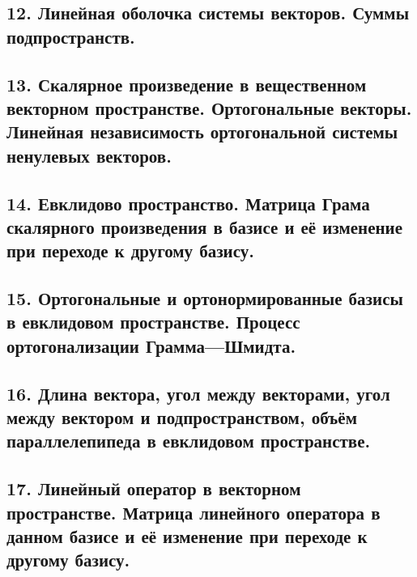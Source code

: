 \documentclass[11pt]{article}
\begin{document}
\subsection{12. Линейная оболочка системы векторов. Суммы подпространств.}
\label{sec:org5550f82}




\subsection{13. Скалярное произведение в вещественном векторном пространстве. Ортогональные векторы. Линейная независимость ортогональной системы ненулевых векторов.}
\label{sec:orgc610b73}




\subsection{14. Евклидово пространство. Матрица Грама скалярного произведения в базисе и её изменение при переходе к другому базису.}
\label{sec:org7c89ed1}




\subsection{15. Ортогональные и ортонормированные базисы в евклидовом пространстве. Процесс ортогонализации Грамма—Шмидта.}
\label{sec:orgd0d61b9}




\subsection{16. Длина вектора, угол между векторами, угол между вектором и подпространством, объём параллелепипеда в евклидовом пространстве.}
\label{sec:orgb8259c6}




\subsection{17. Линейный оператор в векторном пространстве. Матрица линейного оператора в данном базисе и её изменение при переходе к другому базису.}
\label{sec:orgccb5490}

\end{document}
